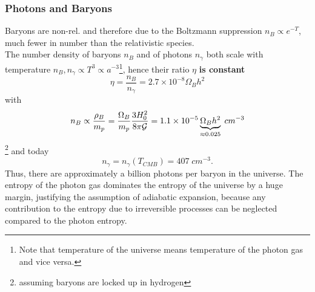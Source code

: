 \subsubsection{Photons and Baryons}
Baryons are non-rel. and therefore due to the Boltzmann suppression $n_B \propto e^{-T}$, much fewer in number than the relativistic species.\\
The number density of baryons $n_B$ and of photons $n_\gamma$ both scale with temperature $n_B,n_\gamma \propto T^3\propto a^{-3}$\footnote{Note that temperature of the universe means temperature of the photon gas and vice versa.}, hence their ratio $\eta$ \textbf{is constant}
\begin{equation}
	\eta = \frac{n_B}{n_\gamma} = 2.7 \times 10^{-8} \Omega_B h^2
\end{equation}
with
\begin{equation}
	n_B \propto \frac{\rho_B}{m_p}= \frac{\Omega_B}{m_p} \frac{3 H^2_0}{8 \pi \mathcal{G}} = 1.1 \times 10^{-5} \underbrace{\Omega_B h^2}_{\approx 0.025} \;cm^{-3}
\end{equation}\footnote{assuming baryons are locked up in hydrogen}
and today
\begin{equation}
	n_\gamma=n_\gamma(T_{CMB}) =407 \; cm^{-3}.
\end{equation}
Thus, there are approximately a billion photons per baryon in the universe. The entropy of the photon gas dominates the entropy of the universe by a huge margin, justifying the assumption of adiabatic expansion, because any contribution to the entropy due to irreversible processes can be neglected compared to the photon entropy.




